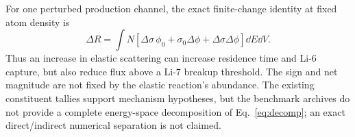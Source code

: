 For one perturbed production channel, the exact finite-change identity at fixed atom density is
\begin{equation}
\Delta R=\int N\left[\Delta\sigma\,\phi_0+\sigma_0\Delta\phi+\Delta\sigma\Delta\phi\right]\dd E\dd V.\label{eq:decomp}
\end{equation}
Thus an increase in elastic scattering can increase residence time and Li-6 capture, but also reduce flux above a Li-7 breakup threshold. The sign and net magnitude are not fixed by the elastic reaction's abundance. The existing constituent tallies support mechanism hypotheses, but the benchmark archives do not provide a complete energy-space decomposition of Eq.~\eqref{eq:decomp}; an exact direct/indirect numerical separation is not claimed.
